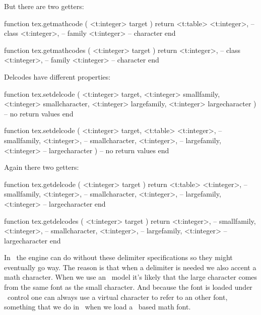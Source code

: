 But there are two getters:

\starttyping[option=LUA]
function tex.getmathcode (
    <t:integer> target
)
    return <t:table> {
        <t:integer>, -- class
        <t:integer>, -- family
        <t:integer>  -- character
    }
end

function tex.getmathcodes (
    <t:integer> target
)
    return
        <t:integer>, -- class
        <t:integer>, -- family
        <t:integer>  -- character
end
\stoptyping

Delcodes have different properties:


\starttyping[option=LUA]
function tex.setdelcode (
    <t:integer> target,
    <t:integer> smallfamily,
    <t:integer> smallcharacter,
    <t:integer> largefamily,
    <t:integer> largecharacter
)
    -- no return values
end

function tex.setdelcode (
    <t:integer> target,
    <t:table>   {
        <t:integer>, -- smallfamily,
        <t:integer>, -- smallcharacter,
        <t:integer>, -- largefamily,
        <t:integer>  -- largecharacter
    }
)
    -- no return values
end
\stoptyping

Again there two getters:

\starttyping[option=LUA]
function tex.getdelcode (
    <t:integer> target
)
    return <t:table> {
        <t:integer>, -- smallfamily,
        <t:integer>, -- smallcharacter,
        <t:integer>, -- largefamily,
        <t:integer>  -- largecharacter
    }
end

function tex.getdelcodes (
    <t:integer> target
)
    return
        <t:integer>, -- smallfamily,
        <t:integer>, -- smallcharacter,
        <t:integer>, -- largefamily,
        <t:integer>  -- largecharacter
 end
\stoptyping

In \LUAMETATEX\ the engine can do without these delimiter specifications so they
might eventually go way. The reason is that when a delimiter is needed we also
accent a math character. When we use an \OPENTYPE\ model it's likely that the
large character comes from the same font as the small character. And because the
font is loaded under \LUA\ control one can always use a virtual character to
refer to an other font, something that we do in \CONTEXT\ when we load a
\TYPEONE\ based math font.

